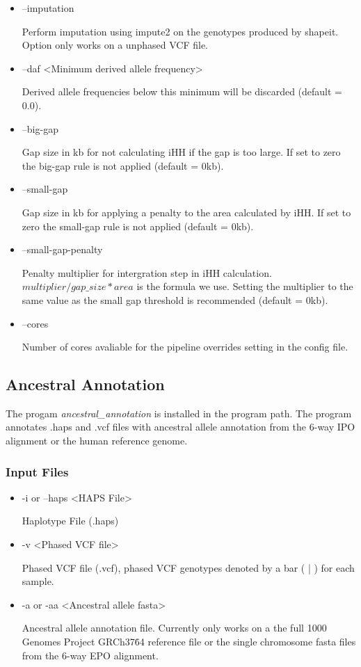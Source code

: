 \documentclass[a4paper,10pt]{article}
\begin{document}
\begin{itemize}
\item --imputation

Perform imputation using impute2 on the genotypes produced by shapeit. Option only works on a unphased VCF file.

\item --daf <Minimum derived allele frequency>

Derived allele frequencies below this minimum will be discarded (default = 0.0).

\item --big-gap

Gap size in kb for not calculating iHH if the gap is too large. If set
to zero the big-gap rule is not applied (default = 0kb).

\item --small-gap

Gap size in kb for applying a penalty to the area calculated by
iHH. If set to zero the small-gap rule is not applied (default = 0kb).

\item --small-gap-penalty

Penalty multiplier for intergration step in iHH
calculation. $multiplier/gap\_size * area$ is the formula we
use. Setting the multiplier to the same value as the small gap
threshold is recommended (default = 0kb).

\item --cores 

Number of cores avaliable for the pipeline overrides setting in the config file. 

\end{itemize}
\subsection{Ancestral Annotation}
The progam \emph{ancestral\_annotation} is installed in the program
path. The program annotates .haps and .vcf files with ancestral allele
annotation from the 6-way IPO alignment or the human reference genome.
\subsubsection{Input Files}
\begin{itemize}
\item -i or --haps <HAPS File>

Haplotype File (.haps)

\item -v <Phased VCF file>

Phased VCF file (.vcf), phased VCF genotypes denoted by a bar ( | ) for each sample.
\item -a or -aa <Ancestral allele fasta>

Ancestral allele annotation file. Currently only works on a the full
1000 Genomes Project GRCh37\.64 reference file or the single chromosome fasta
files from the 6-way EPO alignment.

\end{itemize}
\end{document}
